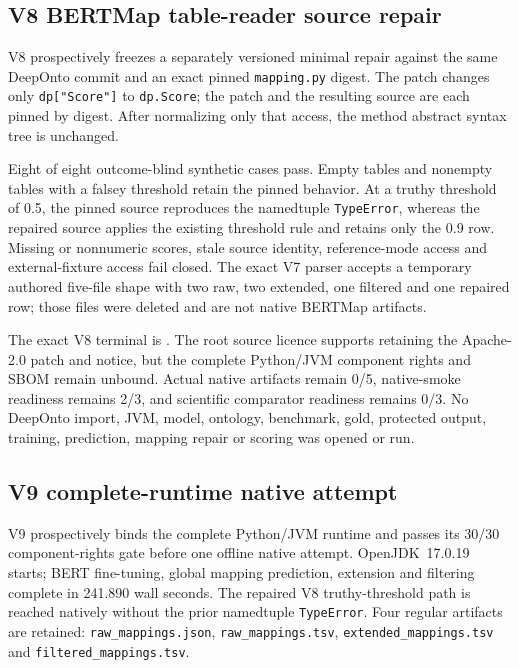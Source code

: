 \subsection{V8 BERTMap table-reader source repair}

V8 prospectively freezes a separately versioned minimal repair against the
same DeepOnto commit and an exact pinned \texttt{mapping.py} digest.
The patch changes only \texttt{dp["Score"]} to \texttt{dp.Score}; the patch and the resulting source are each pinned by digest.
After normalizing only that access, the method abstract syntax tree is
unchanged.

Eight of eight outcome-blind synthetic cases pass. Empty tables and nonempty
tables with a falsey threshold retain the pinned behavior. At a truthy
threshold of 0.5, the pinned source reproduces the namedtuple
\texttt{TypeError}, whereas the repaired source applies the existing threshold
rule and retains only the 0.9 row. Missing or nonnumeric scores, stale source
identity, reference-mode access and external-fixture access fail closed. The
exact V7 parser accepts a temporary authored five-file shape with two raw, two
extended, one filtered and one repaired row; those files were deleted and are
not native BERTMap artifacts.

The exact V8 terminal is
.
The root source licence supports retaining the Apache-2.0 patch and notice, but
the complete Python/JVM component rights and SBOM remain unbound. Actual native
artifacts remain 0/5, native-smoke readiness remains 2/3, and scientific
comparator readiness remains 0/3. No DeepOnto import, JVM, model, ontology,
benchmark, gold, protected output, training, prediction, mapping repair or
scoring was opened or run.

\subsection{V9 complete-runtime native attempt}

V9 prospectively binds the complete Python/JVM runtime and passes its 30/30
component-rights gate before one offline native attempt. OpenJDK~17.0.19 starts;
BERT fine-tuning, global mapping prediction, extension and filtering complete in
241.890 wall seconds. The repaired V8 truthy-threshold path is reached natively
without the prior namedtuple \texttt{TypeError}. Four regular artifacts are
retained: \texttt{raw\_mappings.json}, \texttt{raw\_mappings.tsv},
\texttt{extended\_mappings.tsv} and \texttt{filtered\_mappings.tsv}.

